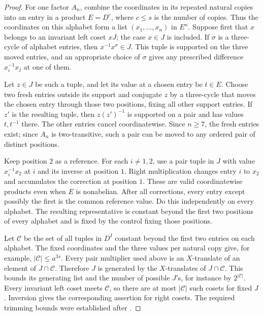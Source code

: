 \begin{proof}
For one factor $A_n$, combine the coordinates in its repeated natural
copies into an entry in a product $E=D^c$, where $c\le s$ is the number
of copies.  Thus the coordinates on this alphabet form a list
$(x_1,\ldots,x_n)$ in $E^n$.
Suppose first that $x$ belongs to an invariant left coset $xJ$; the case
$x\in J$ is included.  If $\sigma$ is a three-cycle of alphabet entries,
then $x^{-1}x^\sigma\in J$.  This tuple is supported on the three moved
entries, and an appropriate choice of $\sigma$ gives any prescribed
difference $x_i^{-1}x_j$ at one of them.

Let $z\in J$ be such a tuple, and let its value at a chosen entry be
$t\in E$.  Choose two fresh entries outside its support and conjugate
$z$ by a three-cycle that moves the chosen entry through those two
positions, fixing all other support entries.  If $z'$ is the resulting
tuple, then $z(z')^{-1}$ is supported on a pair and has values $t,t^{-1}$
there.  The other entries cancel coordinatewise.  Since $n\ge7$, the
fresh entries exist; since $A_n$ is two-transitive, such a pair can be
moved to any ordered pair of distinct positions.

Keep position $2$ as a reference.  For each $i\ne1,2$, use a pair tuple
in $J$ with value $x_i^{-1}x_2$ at $i$ and its inverse at position $1$.
Right multiplication changes entry $i$ to $x_2$ and accumulates the
correction at position $1$.  These are valid coordinatewise products
even when $E$ is nonabelian.  After all corrections, every entry except
possibly the first is the common reference value.  Do this independently
on every alphabet.  The resulting representative is constant beyond
the first two positions of every alphabet and is fixed by the control
fixing those positions.

Let $\mathcal C$ be the set of all tuples in $D^I$ constant beyond the
first two entries on each alphabet.  The fixed coordinates and the three
values per natural copy give, for example, $|\mathcal C|\le a^{3s}$.
Every pair multiplier used above is an $X$-translate of an element of
$J\cap\mathcal C$.  Therefore $J$ is generated by the $X$-translates of
$J\cap\mathcal C$.  This bounds its generating list and the number of
possible $J$'s, for instance by $2^{|\mathcal C|}$.  Every invariant
left coset meets $\mathcal C$, so there are at most $|\mathcal C|$
such cosets for fixed $J$.  Inversion gives the corresponding assertion
for right cosets.  The required trimming bounds were established after
.
\end{proof}

